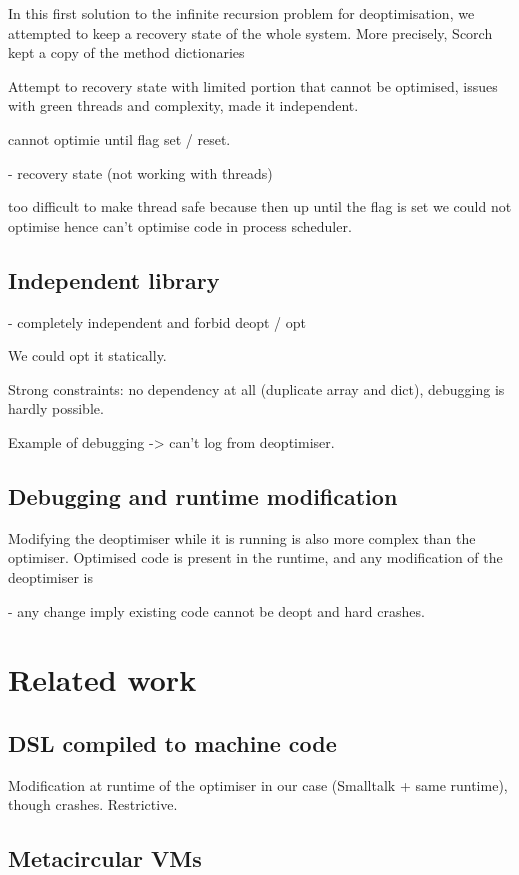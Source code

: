 \documentclass[a4paper,12pt,twoside]{../includes/ThesisStyle}
\begin{document}
In this first solution to the infinite recursion problem for deoptimisation, we attempted to keep a recovery state of the whole system. More precisely, Scorch kept a copy of the method dictionaries

 Attempt to recovery state with limited portion that cannot be optimised, issues with green threads and complexity, made it independent.

cannot optimie until flag set / reset.

- recovery state (not working with threads)

too difficult to make thread safe because then up until the flag is set we could not optimise hence can't optimise code in process scheduler.

\subsection{Independent library}

- completely independent and forbid deopt / opt

We could opt it statically.

Strong constraints: no dependency at all (duplicate array and dict), debugging is hardly possible.

Example of debugging -> can't log from deoptimiser. 

\subsection{Debugging and runtime modification}

Modifying the deoptimiser while it is running is also more complex than the optimiser. Optimised code is present in the runtime, and any modification of the deoptimiser is

- any change imply existing code cannot be deopt and hard crashes.

\section{Related work}

\subsection{DSL compiled to machine code}

Modification at runtime of the optimiser in our case (Smalltalk + same runtime), though crashes.
Restrictive.

\subsection{Metacircular VMs}
\end{document}
